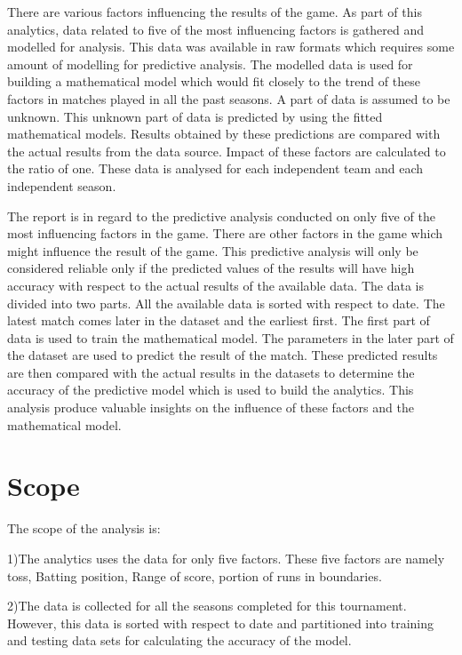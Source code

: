 \documentclass[sigconf]{acmart}
\begin{document}
There are various factors influencing the results of the game. As part of this analytics, data related to five of the most influencing factors is gathered and modelled for analysis. This data was available in raw formats which requires some amount of modelling for predictive analysis. The modelled data is used for building a mathematical model which would fit closely to the trend of these factors in matches played in all the past seasons. A part of data is assumed to be unknown. This unknown part of data is predicted by using the fitted mathematical models. Results obtained by these predictions are compared with the actual results from the data source. Impact of these factors are calculated to the ratio of one. These data is analysed for each independent team and each independent season.

 
The report is in regard to the predictive analysis conducted on only five of the most influencing factors in the game. There are other factors in the game which might influence the result of the game. This predictive analysis will only be considered reliable only if the predicted values of the results will have high accuracy with respect to the actual results of the available data. The data is divided into two parts. All the available data is sorted with respect to date. The latest match comes later in the dataset and the earliest first. The first part of data is used to train the mathematical model. The parameters in the later part of the dataset are used to predict the result of the match. These predicted results are then compared with the actual results in the datasets to determine the accuracy of the predictive model which is used to build the analytics. This analysis produce valuable insights on the influence of these factors and the mathematical model.


\section{Scope}

The scope of the analysis is:


1)The analytics uses the data for only five factors. These five factors are  namely toss, Batting position, Range of score, portion of runs in boundaries.


2)The data is collected for all the seasons completed for this tournament. However, this data is sorted with respect to date and partitioned into training and testing data sets for calculating the accuracy of the model.
\end{document}
